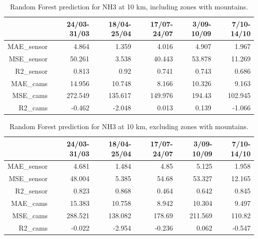 \begin{table}[H]
\begin{tabular}{rrrrrr}
\hline
      &   24/03-31/03 &   18/04-25/04 &   17/07-24/07 &   3/09-10/09 &   7/10-14/10 \\
\hline
   MAE\_sensor   &            4.864 &            1.359 &            4.016 &            4.907 &            1.967 \\
   MSE\_sensor   &           50.261 &            3.538 &           40.443 &           53.878 &           11.269 \\
  R2\_sensor    &            0.813 &            0.92  &            0.741 &            0.743 &            0.686 \\
   MAE\_cams     &           14.956 &           10.748 &            8.166 &           10.326 &            9.163 \\
  MSE\_cams     &          272.549 &          135.617 &          149.976 &          194.43  &          102.945 \\
   R2\_cams      &           -0.462 &           -2.048 &            0.013 &            0.139 &           -1.066 \\
\hline
\end{tabular}
\caption{Random Forest prediction for NH3 at 10 km, including zones with mountains.}
\end{table}

\begin{table}[H]
\begin{tabular}{rrrrrr}
\hline
      &   24/03-31/03 &   18/04-25/04 &   17/07-24/07 &   3/09-10/09 &   7/10-14/10 \\
\hline
   MAE\_sensor   &            4.681 &            1.484 &            4.85  &            5.125 &            1.958 \\
   MSE\_sensor   &           48.004 &            5.385 &           54.68  &           53.327 &           12.165 \\
   R2\_sensor    &            0.823 &            0.868 &            0.464 &            0.642 &            0.845 \\
   MAE\_cams     &           15.383 &           10.758 &            8.942 &           10.304 &            9.497 \\
   MSE\_cams     &          288.521 &          138.082 &          178.69  &          211.569 &          110.82  \\
   R2\_cams      &           -0.022 &           -2.954 &           -0.236 &            0.062 &           -0.547 \\
\hline
\end{tabular}
\caption{Random Forest prediction for NH3 at 10 km, excluding zones with mountains.}
\end{table}

